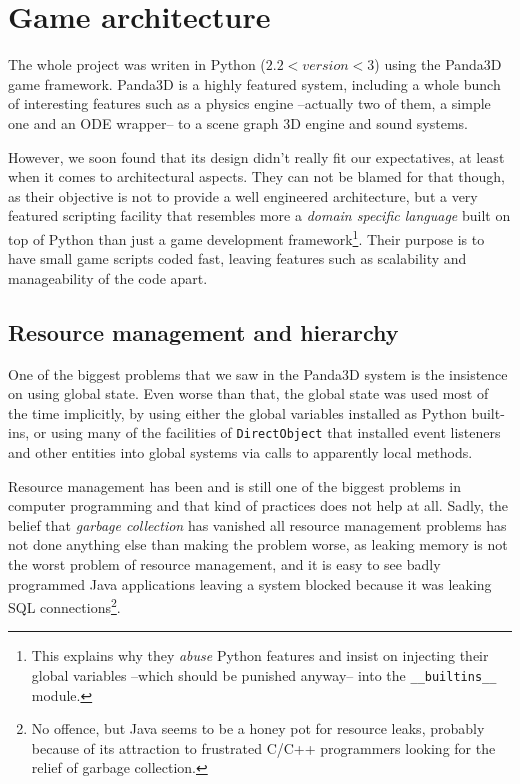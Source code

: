 \documentclass[a4paper,10pt]{article}
\begin{document}
\section{Game architecture}

The whole project was writen in Python ($2.2 < version < 3$) using the
Panda3D\cite{gosling04panda3d} game framework. Panda3D is a highly featured system,
including a whole bunch of interesting features such as a physics
engine --actually two of them, a simple one and an ODE\cite{odephysics}
wrapper-- to a scene graph 3D engine and sound systems.

However, we soon found that its design didn't really fit our
expectatives, at least when it comes to architectural aspects. They
can not be blamed for that though, as their objective is not to
provide a well engineered architecture, but a very featured scripting
facility that resembles more a \emph{domain specific language} built
on top of Python than just a game development framework\footnote{This
  explains why they \emph{abuse} Python features and insist on
  injecting their global variables --which should be punished anyway--
into the \texttt{\_\_builtins\_\_} module.}. Their purpose
is to have small game scripts coded fast, leaving features such as
scalability and manageability of the code apart.

\subsection{Resource management and hierarchy}

One of the biggest problems that we saw in the Panda3D system is the
insistence on using global state. Even worse than that, the global
state was used most of the time implicitly, by using either the global
variables installed as Python built-ins, or using many of the
facilities of \texttt{DirectObject} that installed event listeners
and other entities into global systems via calls to apparently local
methods.

Resource management has been and is still one of the biggest problems
in computer programming and that kind of practices does not help at
all. Sadly, the belief that \emph{garbage collection} has vanished all
resource management problems has not done anything else than making
the problem worse, as leaking memory is not the worst problem of
resource management, and it is easy to see badly programmed Java
applications leaving a system blocked because it was leaking SQL
connections\footnote{No offence, but Java seems to be a honey pot for
  resource leaks, probably because of its attraction to frustrated
  C/C++ programmers looking for the relief of garbage collection.}.
\end{document}
